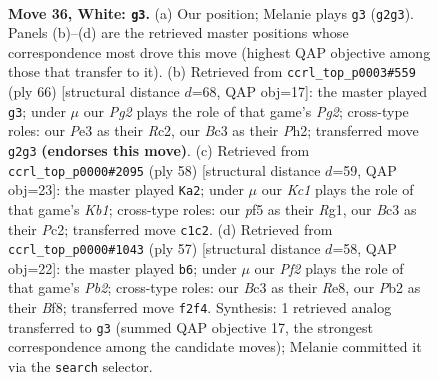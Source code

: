 \documentclass[11pt]{article}
\begin{document}
\clearpage

\begin{figure}[p]\centering
\begin{subfigure}{0.46\textwidth}\centering
\resizebox{\linewidth}{!}{%
\newchessgame
\chessboard[
  setfen={rk6/1p2b1pr/p1p1b2p/P4p2/2pP3P/2B1P3/1P3PPN/R1K4R w - - 6 36},
  showmover=false,
  pgfstyle=straightmove, color=movearrow, markmove={g2-g3}
]}
\caption{}
\end{subfigure}\hfill
\begin{subfigure}{0.46\textwidth}\centering
\resizebox{\linewidth}{!}{%
\newchessgame
\chessboard[
  setfen={1r1r2k1/1b3pp1/3bp2p/pB1p4/Pp1P1P2/1P2P3/2RN2PP/2R3K1 w - - 7 34},
  showmover=false,
  pgfstyle=straightmove, color=movearrow, markmove={g2-g3}
]}
\caption{}
\end{subfigure}
\\[4pt]
\begin{subfigure}{0.46\textwidth}\centering
\resizebox{\linewidth}{!}{%
\newchessgame
\chessboard[
  setfen={4k1r1/1r2pp2/3p3p/p2P2b1/Pp6/3B1PPR/1PP5/1K4R1 w - - 5 30},
  showmover=false,
  pgfstyle=straightmove, color=movearrow, markmove={b1-a2}
]}
\caption{}
\end{subfigure}\hfill
\begin{subfigure}{0.46\textwidth}\centering
\resizebox{\linewidth}{!}{%
\newchessgame
\chessboard[
  setfen={3rrbk1/pp3p2/3ppP1p/7p/P1PBP3/1P6/6PP/4RR1K b - - 0 29},
  showmover=false,
  pgfstyle=straightmove, color=movearrow, markmove={b7-b6}
]}
\caption{}
\end{subfigure}
\caption{\textbf{Move 36, White: \texttt{g3}.} (a) Our position; Melanie plays \texttt{g3} (\texttt{g2g3}). Panels (b)--(d) are the retrieved master positions whose correspondence most drove this move (highest QAP objective among those that transfer to it). (b) Retrieved from \texttt{ccrl\_top\_p0003\#559} (ply 66) [structural distance $d$=68, QAP obj=17]: the master played \texttt{g3}; under $\mu$ our \emph{Pg2} plays the role of that game's \emph{Pg2}; cross-type roles: our \emph{P}e3 as their \emph{R}c2, our \emph{B}c3 as their \emph{P}h2; transferred move \texttt{g2g3} \textbf{(endorses this move)}. (c) Retrieved from \texttt{ccrl\_top\_p0000\#2095} (ply 58) [structural distance $d$=59, QAP obj=23]: the master played \texttt{Ka2}; under $\mu$ our \emph{Kc1} plays the role of that game's \emph{Kb1}; cross-type roles: our \emph{p}f5 as their \emph{R}g1, our \emph{B}c3 as their \emph{P}c2; transferred move \texttt{c1c2}. (d) Retrieved from \texttt{ccrl\_top\_p0000\#1043} (ply 57) [structural distance $d$=58, QAP obj=22]: the master played \texttt{b6}; under $\mu$ our \emph{Pf2} plays the role of that game's \emph{Pb2}; cross-type roles: our \emph{B}c3 as their \emph{R}e8, our \emph{P}b2 as their \emph{B}f8; transferred move \texttt{f2f4}. Synthesis: 1 retrieved analog transferred to \texttt{g3} (summed QAP objective 17, the strongest correspondence among the candidate moves); Melanie committed it via the \texttt{search} selector.}
\label{fig:thought-m70}
\end{figure}
\end{document}
